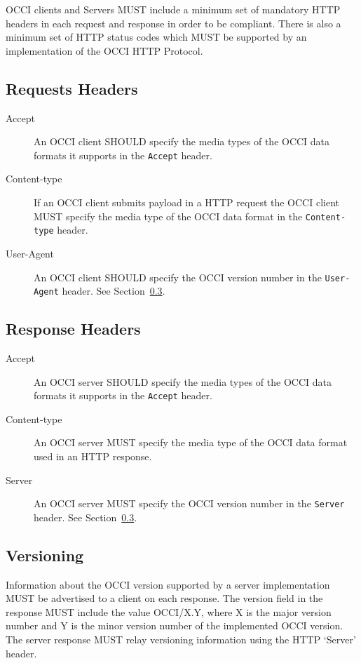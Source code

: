 \documentclass[10pt,a4paper]{article}
\begin{document}
OCCI clients and Servers MUST include a minimum set of mandatory HTTP headers
in each request and response in order to be compliant.
There is also a minimum set of HTTP status codes which MUST be supported by
an implementation of the OCCI HTTP Protocol.

\subsection{Requests Headers}

\begin{description}
\item[Accept] An OCCI client SHOULD specify the media types of the OCCI data
formats it supports in the {\tt Accept} header.
\item[Content-type] If an OCCI client submits payload in a HTTP request
the OCCI client MUST specify the media type of the OCCI data format
in the {\tt Content-type} header.
\item[User-Agent] An OCCI client SHOULD specify the OCCI version
number in the {\tt User-Agent} header. See Section~\ref{subsec:versioning}.
\end{description}

\subsection{Response Headers}

\begin{description}
\item[Accept] An OCCI server SHOULD specify the media types of the OCCI data
formats it supports in the {\tt Accept} header.
\item[Content-type] An OCCI server MUST specify the media type of the OCCI data
format used in an HTTP response.
\item[Server] An OCCI server MUST specify the OCCI version number in the {\tt Server}
header. See Section~\ref{subsec:versioning}.
\end{description}

\subsection{Versioning}
\label{subsec:versioning}
Information about the OCCI version supported by a server implementation
MUST be advertised to a client on each response.
The version field in the response MUST include the value
OCCI/X.Y, where X is the major version number and Y is the minor
version number of the implemented OCCI version. The server
response MUST relay versioning information using the HTTP `Server'
header.
\end{document}
